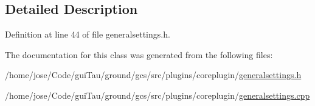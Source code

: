 \subsection{Detailed Description}


Definition at line 44 of file generalsettings.\-h.



The documentation for this class was generated from the following files\-:\begin{DoxyCompactItemize}
\item 
/home/jose/\-Code/gui\-Tau/ground/gcs/src/plugins/coreplugin/\hyperlink{generalsettings_8h}{generalsettings.\-h}\item 
/home/jose/\-Code/gui\-Tau/ground/gcs/src/plugins/coreplugin/\hyperlink{generalsettings_8cpp}{generalsettings.\-cpp}\end{DoxyCompactItemize}
